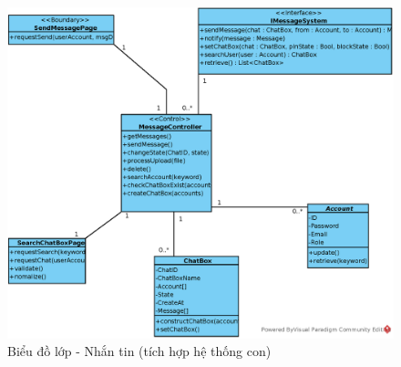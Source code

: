\documentclass[./../main.tex]{subfiles}
\begin{document}
\begin{figure}[H]
    \centering
    \includegraphics[width=\linewidth]{./images/UseCaseDesignDiagram/ucd_ss_message.eps}
    \caption{Biểu đồ lớp - Nhắn tin (tích hợp hệ thống con)}
\end{figure}
\end{document}
